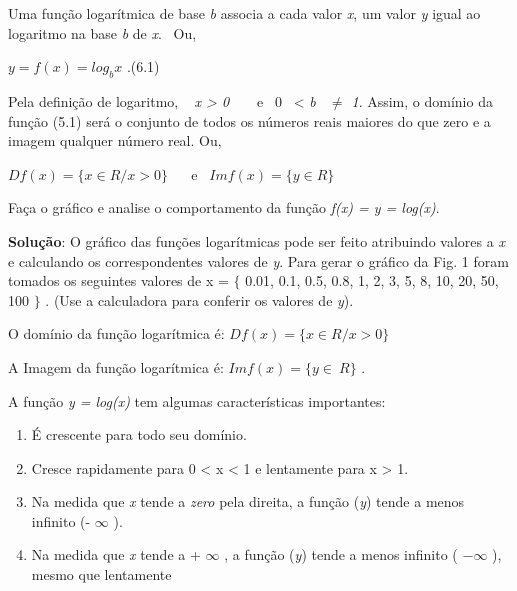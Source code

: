 \begin{caixa}
    \begin{tdefinicao}

    Uma função logarítmica de base \textit{b} associa a cada valor \textit{x}, um valor \textit{y} igual ao logaritmo na base \textit{b} de \textit{x}.~ Ou,

    \( y=f \left( x \right) =log_{b}x  \) .\quad \quad \quad \quad \quad \quad (6.1)


    Pela definição de logaritmo, ~  \textit{x > 0}~~~~e~  0~ < \textit{b~ $ \neq $  1}. Assim, o domínio da função (5.1) será o conjunto de todos os números reais maiores do que zero e a imagem qualquer número real. Ou,

    \( Df \left( x \right) = \{ x \in R / x>0 \}  \) ~~ \quad e~ \quad  \( Imf \left( x \right) = \{ y \in R  \}  \) \qedsymbol{}
    \end{tdefinicao}
\end{caixa}

\begin{texemplo}
    Faça o gráfico e analise o comportamento da função \textit{f(x) = y = log(x)}.
    
    \textbf{Solução}: O gráfico das funções logarítmicas pode ser feito atribuindo valores a \textit{x} e calculando os correspondentes valores de \textit{y}. Para gerar o gráfico da Fig. 1 foram tomados os seguintes valores de x = $ \{ $ 0.01, 0.1, 0.5, 0.8, 1, 2, 3, 5, 8, 10, 20, 50, 100 $ \} $ . (Use a calculadora para conferir os valores de \textit{y}).
\end{texemplo}

O domínio da função logarítmica é:  \( Df \left( x \right) = \{ x \in  R / x>0  \}  \) 

A Imagem da função logarítmica é:  \( Imf \left( x \right) = \{ y \in ~R   \}  \) .

A função \textit{y = log(x)} tem algumas características importantes:

\begin{enumerate}
    \item É crescente para todo seu domínio. 

	\item Cresce rapidamente para 0 < x < 1 e lentamente para x > 1. 

	\item Na medida que \textit{x} tende a \textit{zero} pela direita, a função (\textit{y}) tende a menos infinito (-  \( \infty \) ).

	\item Na medida que \textit{x} tende a +  \( \infty \) , a função (\textit{y}) tende a menos infinito (  \( -\infty \) ), mesmo que lentamente\qedsymbol{}
\end{enumerate}

